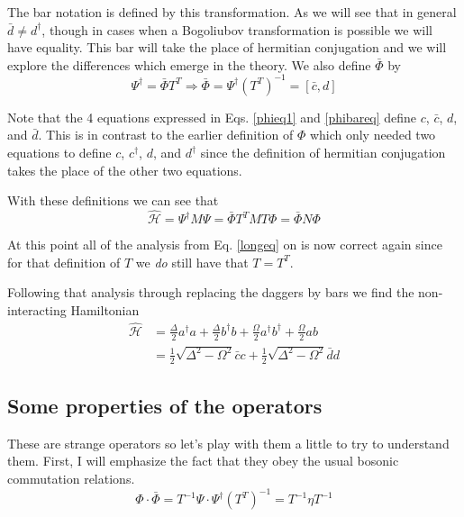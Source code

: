 \documentclass[12pt]{article}
\begin{document}
The bar notation is defined by this transformation. As we will see that in general $\bar{d}\neq d^{\dag}$, though in cases when a Bogoliubov transformation is possible we will have equality. This bar will take the place of hermitian conjugation and we will explore the differences which emerge in the theory. We also define $\bar{\Phi}$ by
\begin{equation}
\label{phibareq}
\Psi^{\dag} = \bar{\Phi} T^{T} \Rightarrow \bar{\Phi} = \Psi^{\dag} (T^{T})^{-1} = [\bar{c}, d]
\end{equation}

Note that the 4 equations expressed in Eqs. \ref{phieq1} and \ref{phibareq} define $c$, $\bar{c}$, $d$, and $\bar{d}$. This is in contrast to the earlier definition of $\Phi$ which only needed two equations to define $c$, $c^{\dag}$, $d$, and $d^{\dag}$ since the definition of hermitian conjugation takes the place of the other two equations. 

With these definitions we can see that
\begin{equation}
\hat{\mathcal{H}} = \Psi^{\dag}M\Psi = \bar{\Phi}T^T M T \Phi = \bar{\Phi}N\Phi
\end{equation}

At this point all of the analysis from Eq. \ref{longeq} on is now correct again since for that definition of $T$ we \textit{do} still have that $T=T^T$.

Following that analysis through replacing the daggers by bars we find the non-interacting Hamiltonian
\begin{align}
\hat{\mathcal{H}} &= \frac{\Delta}{2} a^{\dagger}a + \frac{\Delta}{2} b^\dag b + \frac{\Omega}{2} a^\dag b^{\dag} + \frac{\Omega}{2} ab\\
&= \frac{1}{2} \sqrt{\Delta^2-\Omega^2} \bar{c}c + \frac{1}{2} \sqrt{\Delta^2-\Omega^2} \bar{d}d
\end{align}

\subsection{Some properties of the operators}

These are strange operators so let's play with them a little to try to understand them. First, I will emphasize the fact that they obey the usual bosonic commutation relations.
\begin{equation}
\Phi \cdot \bar{\Phi} = T^{-1}\Psi \cdot \Psi^{\dag} (T^T)^{-1} = T^{-1} \eta T^{-1}
\end{equation}
\end{document}
